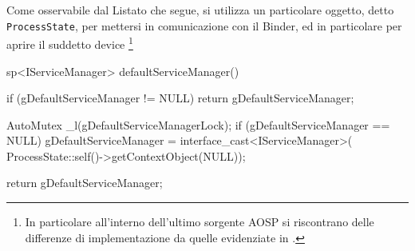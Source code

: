 Come osservabile dal Listato che segue, si utilizza un
particolare oggetto, detto \texttt{\small ProcessState}, per mettersi in 
comunicazione con il Binder, ed in particolare per aprire il suddetto device
\footnote{In particolare all'interno dell'ultimo sorgente AOSP si riscontrano
 delle differenze di implementazione da quelle evidenziate in \parencite{site:anonBinder}.}
\begin{cpp}[caption=$ $IServiceManager.cpp]
sp<IServiceManager> defaultServiceManager()
{
    if (gDefaultServiceManager != NULL) return gDefaultServiceManager;
    
    {
        AutoMutex _l(gDefaultServiceManagerLock);
        if (gDefaultServiceManager == NULL) {
            gDefaultServiceManager = interface_cast<IServiceManager>(
                ProcessState::self()->getContextObject(NULL));
        }
    }
    
    return gDefaultServiceManager;
}
\end{cpp}

